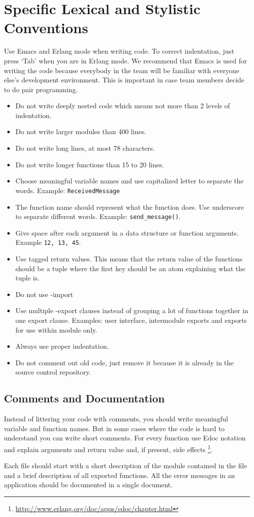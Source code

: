 \section{Specific Lexical and Stylistic Conventions}
Use Emacs and Erlang mode when writing code. To correct indentation, just press ‘Tab’ when you are in Erlang mode. We recommend that Emacs is used for writing the code because everybody in the team will be familiar with everyone else's development environment. This is important in case team members decide to do pair programming.

\begin{itemize}

\item Do not write deeply nested code which means not more than 2 levels of indentation. 
\item Do not write larger modules than 400 lines. 
\item Do not write long lines, at most 78 characters.
\item Do not write longer functions than 15 to 20 lines. 
\item Choose meaningful variable names and use capitalized letter to separate the words. Example: \texttt{ReceivedMessage}
\item The function name should represent what the function does. Use underscore to separate different words. Example: \texttt{send\_message()}.
\item Give space after each argument in a data structure or function arguments. Example \texttt{{12, 13, 45}}.
\item Use tagged return values. This means that the return value of the functions should be a tuple where the first key should be an atom explaining what the tuple is.
\item Do not use -import
\item Use multiple -export clauses instead of grouping a lot of functions together in one export clause. Examples: user interface, intermodule exports and exports for use within module only. 
\item Always use proper indentation.
\item Do not comment out old code, just remove it because it is already in the source control repository.  
\end{itemize}

\subsection{Comments and Documentation}
Instead of littering your code with comments, you should write meaningful variable and function names. But in some cases where the code is hard to understand you can write short comments. For every function use Edoc notation and explain arguments and return value and, if present, side effects \footnote{\url{http://www.erlang.org/doc/apps/edoc/chapter.html}}.

Each file should start with a short description of the module contained in the file and a brief description of all exported functions. All the error messages in an application should be documented in a single document.  




